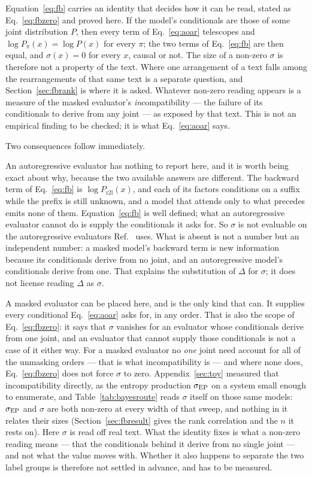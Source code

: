 Equation~\eqref{eq:fb} carries an identity that decides how it can be read,
stated as Eq.~\eqref{eq:fbzero} and proved here.  If the model's
conditionals are those of some joint distribution $P$, then every term of
Eq.~\eqref{eq:aoar} telescopes and $\log P_\pi(x) = \log P(x)$ for every
$\pi$; the two terms of Eq.~\eqref{eq:fb} are then equal, and $\sigma(x) =
0$ for every $x$, causal or not.  The size of a non-zero $\sigma$ is therefore
not a property of the text.  Where one arrangement of a text falls among
the rearrangements of that same text is a separate question, and
Section~\ref{sec:fbrank} is where it is asked.  Whatever
non-zero reading appears is a measure of the masked evaluator's \emph{in}compatibility
--- the failure of its conditionals to derive from any joint --- as exposed
by that text.  This is not an empirical finding to be checked; it is what
Eq.~\eqref{eq:aoar} says.

Two consequences follow immediately.

An autoregressive evaluator has nothing to report here, and it is worth
being exact about why, because the two available answers are different.  The
backward term of Eq.~\eqref{eq:fb} is $\log P_{\mathrm{r2l}}(x)$, and each of
its factors
conditions on a suffix while the prefix is still unknown, and a model that
attends only to what precedes emits none of them.  Equation~\eqref{eq:fb}
is well defined; what an autoregressive evaluator cannot do is supply the
conditionals it asks for.  So $\sigma$ is not evaluable on the
autoregressive evaluators Ref.~\cite{sagawa2026} uses.  What is absent is
not a number but an independent number: a masked model's backward term is
new information because its conditionals derive from no joint, and an
autoregressive model's conditionals derive from one.  That explains the
substitution of $\Delta$ for $\sigma$; it does not license reading $\Delta$
as $\sigma$.

A masked evaluator can be placed here, and is the only kind that can.  It
supplies every conditional Eq.~\eqref{eq:aoar} asks for, in any order.  That
is also the scope of Eq.~\eqref{eq:fbzero}: it says that $\sigma$ vanishes
for an evaluator whose conditionals derive from one joint, and an evaluator
that cannot supply those conditionals is not a case of it either way.  For a
masked evaluator no \emph{one} joint need account for all of the unmasking
orders --- that is what incompatibility is --- and where none does,
Eq.~\eqref{eq:fbzero} does not force $\sigma$ to zero.
Appendix~\ref{sec:toy} measured that incompatibility directly, as the
entropy production $\sigma_{\mathrm{EP}}$ on a system small enough to enumerate, and
Table~\ref{tab:bayesroute} reads $\sigma$ itself on those same models:
$\sigma_{\mathrm{EP}}$ and $\sigma$ are both non-zero at every width of that sweep, and
nothing in it relates their sizes (Section~\ref{sec:fbresult} gives the rank
correlation and the $n$ it rests on).  Here $\sigma$ is read off real text.
What the identity fixes is what a non-zero reading means --- that the
conditionals behind it derive from no single joint --- and not what the
value moves with.  Whether it also happens to separate the two label groups
is therefore not settled in advance, and has to be measured.

